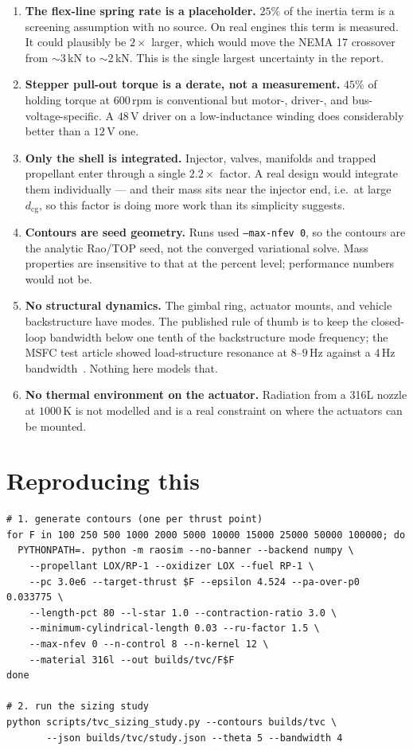 \documentclass[11pt]{article}
\begin{document}
\begin{enumerate}[leftmargin=1.4em,itemsep=3pt]
\item \textbf{The flex-line spring rate is a placeholder.} $25\%$ of the
inertia term is a screening assumption with no source. On real engines this
term is measured. It could plausibly be $2\times$ larger, which would move
the NEMA 17 crossover from $\sim$3\,kN to $\sim$2\,kN. This is the single
largest uncertainty in the report.
\item \textbf{Stepper pull-out torque is a derate, not a measurement.}
$45\%$ of holding torque at $600$\,rpm is conventional but motor-, driver-,
and bus-voltage-specific. A $48$\,V driver on a low-inductance winding does
considerably better than a $12$\,V one.
\item \textbf{Only the shell is integrated.} Injector, valves, manifolds and
trapped propellant enter through a single $2.2\times$ factor. A real design
would integrate them individually --- and their mass sits near the injector
end, i.e.\ at large $d_{\text{cg}}$, so this factor is doing more work than
its simplicity suggests.
\item \textbf{Contours are seed geometry.} Runs used
\texttt{--max-nfev 0}, so the contours are the analytic Rao/TOP seed, not the
converged variational solve. Mass properties are insensitive to that at the
percent level; performance numbers would not be.
\item \textbf{No structural dynamics.} The gimbal ring, actuator mounts, and
vehicle backstructure have modes. The published rule of thumb is to keep the
closed-loop bandwidth below one tenth of the backstructure mode frequency;
the MSFC test article showed load-structure resonance at $8$--$9$\,Hz against
a $4$\,Hz bandwidth~\cite{cowan1994}. Nothing here models that.
\item \textbf{No thermal environment on the actuator.} Radiation from a
316L nozzle at $1000$\,K is not modelled and is a real constraint on
where the actuators can be mounted.
\end{enumerate}

\section{Reproducing this}

\begin{lstlisting}
# 1. generate contours (one per thrust point)
for F in 100 250 500 1000 2000 5000 10000 15000 25000 50000 100000; do
  PYTHONPATH=. python -m raosim --no-banner --backend numpy \
    --propellant LOX/RP-1 --oxidizer LOX --fuel RP-1 \
    --pc 3.0e6 --target-thrust $F --epsilon 4.524 --pa-over-p0 0.033775 \
    --length-pct 80 --l-star 1.0 --contraction-ratio 3.0 \
    --minimum-cylindrical-length 0.03 --ru-factor 1.5 \
    --max-nfev 0 --n-control 8 --n-kernel 12 \
    --material 316l --out builds/tvc/F$F
done

# 2. run the sizing study
python scripts/tvc_sizing_study.py --contours builds/tvc \
       --json builds/tvc/study.json --theta 5 --bandwidth 4
\end{lstlisting}
\end{document}
